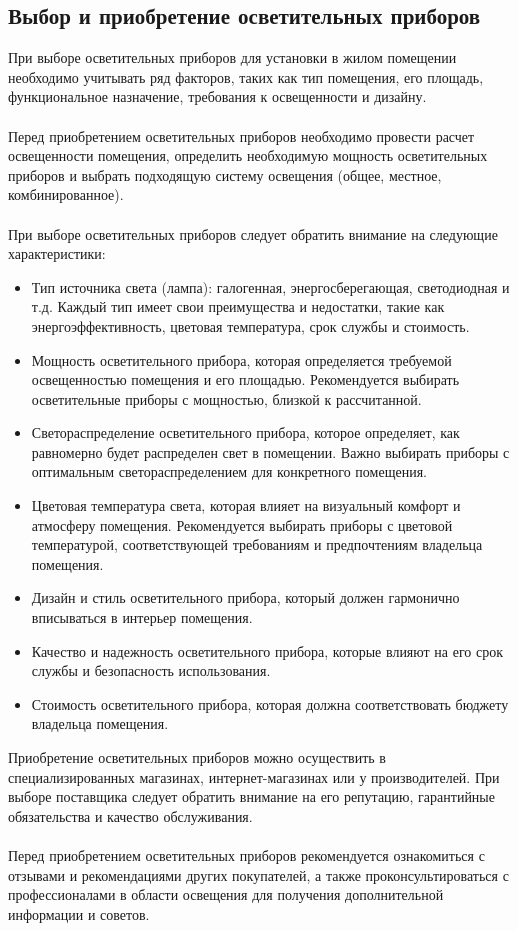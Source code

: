 \documentclass{article}
\begin{document}
\subsection{Выбор и приобретение осветительных приборов}
При выборе осветительных приборов для установки в жилом помещении необходимо учитывать ряд факторов, таких как тип помещения, его площадь, функциональное назначение, требования к освещенности и дизайну.\\
~\\
Перед приобретением осветительных приборов необходимо провести расчет освещенности помещения, определить необходимую мощность осветительных приборов и выбрать подходящую систему освещения (общее, местное, комбинированное).\\
~\\
При выборе осветительных приборов следует обратить внимание на следующие характеристики:
\begin{itemize}
\item Тип источника света (лампа): галогенная, энергосберегающая, светодиодная и т.д. Каждый тип имеет свои преимущества и недостатки, такие как энергоэффективность, цветовая температура, срок службы и стоимость.
\item Мощность осветительного прибора, которая определяется требуемой освещенностью помещения и его площадью. Рекомендуется выбирать осветительные приборы с мощностью, близкой к рассчитанной.
\item Светораспределение осветительного прибора, которое определяет, как равномерно будет распределен свет в помещении. Важно выбирать приборы с оптимальным светораспределением для конкретного помещения.
\item Цветовая температура света, которая влияет на визуальный комфорт и атмосферу помещения. Рекомендуется выбирать приборы с цветовой температурой, соответствующей требованиям и предпочтениям владельца помещения.
\item Дизайн и стиль осветительного прибора, который должен гармонично вписываться в интерьер помещения.
\item Качество и надежность осветительного прибора, которые влияют на его срок службы и безопасность использования.
\item Стоимость осветительного прибора, которая должна соответствовать бюджету владельца помещения.
\end{itemize}
Приобретение осветительных приборов можно осуществить в специализированных магазинах, интернет-магазинах или у производителей. При выборе поставщика следует обратить внимание на его репутацию, гарантийные обязательства и качество обслуживания.\\
~\\
Перед приобретением осветительных приборов рекомендуется ознакомиться с отзывами и рекомендациями других покупателей, а также проконсультироваться с профессионалами в области освещения для получения дополнительной информации и советов.
\end{document}
